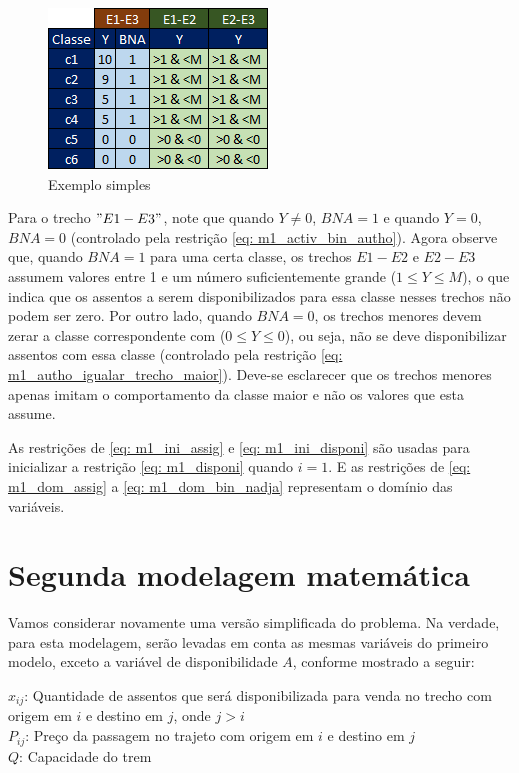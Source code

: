 \begin{figure}[!ht]
	\begin{center}
		\includegraphics[scale=0.8]{img/tab_trechos_maiores.png}
		\caption{Exemplo simples}
		\label{fig: exemplo_sip}
	\end{center}
\end{figure}

Para o trecho $"E1-E3"$, note que quando $Y \neq 0$, $BNA = 1$ e quando $Y = 0$, $BNA = 0$ (controlado pela restrição \ref{eq: m1_activ_bin_autho}). Agora observe que, quando $ BNA = 1$ para uma certa classe, os trechos $E1-E2$ e $E2-E3$ assumem valores entre 1 e um número suficientemente grande ($1 \le Y \leq M$), o que indica que os assentos a serem disponibilizados para essa classe nesses trechos não podem ser zero. Por outro lado, quando $BNA = 0$, os trechos menores devem zerar a classe correspondente com ($0 \leq Y \leq 0$), ou seja, não se deve disponibilizar assentos com essa classe (controlado pela restrição \ref{eq: m1_autho_igualar_trecho_maior}). Deve-se esclarecer que os trechos menores apenas imitam o comportamento da classe maior e não os valores que esta assume.

As restrições de \ref{eq: m1_ini_assig} e \ref{eq: m1_ini_disponi} são usadas para inicializar a restrição \ref{eq: m1_disponi} quando \(i = 1\). E as restrições de \ref{eq: m1_dom_assig} a \ref{eq: m1_dom_bin_nadja} representam o domínio das variáveis.

\section{Segunda modelagem matemática}\label{sec:modelo2}

Vamos considerar novamente uma versão simplificada do problema. Na verdade, para esta modelagem, serão levadas em conta as mesmas variáveis do primeiro modelo, exceto a variável de disponibilidade \(A\), conforme mostrado a seguir:

\noindent $x_{ij}$: Quantidade de assentos que será disponibilizada para venda no trecho com origem em $i$ e destino em $j$, onde $j>i$ \\
\noindent $P_{ij}$: Preço da passagem no trajeto com origem em $i$ e destino em $j$ \\
\noindent $Q$: Capacidade do trem

